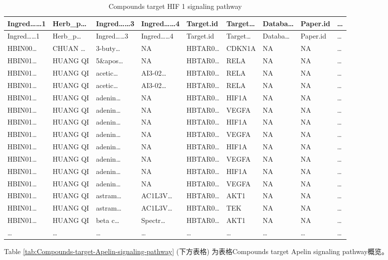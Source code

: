 \documentclass[
]{article}
\begin{document}
\begin{longtable}[]{@{}lllllllll@{}}
\caption{\label{tab:Compounds-target-HIF-1-signaling-pathway}Compounds target HIF 1 signaling pathway}\tabularnewline
\toprule
Ingred\ldots\ldots1 & Herb\_p\ldots{} & Ingred\ldots\ldots3 & Ingred\ldots\ldots4 & Target.id & Target\ldots{} & Databa\ldots{} & Paper.id & \ldots{}\tabularnewline
\midrule
\endfirsthead
\toprule
Ingred\ldots\ldots1 & Herb\_p\ldots{} & Ingred\ldots\ldots3 & Ingred\ldots\ldots4 & Target.id & Target\ldots{} & Databa\ldots{} & Paper.id & \ldots{}\tabularnewline
\midrule
\endhead
HBIN00\ldots{} & CHUAN \ldots{} & 3-buty\ldots{} & NA & HBTAR0\ldots{} & CDKN1A & NA & NA & \ldots{}\tabularnewline
HBIN01\ldots{} & HUANG QI & 5\&apos\ldots{} & NA & HBTAR0\ldots{} & RELA & NA & NA & \ldots{}\tabularnewline
HBIN01\ldots{} & HUANG QI & acetic\ldots{} & AI3-02\ldots{} & HBTAR0\ldots{} & RELA & NA & NA & \ldots{}\tabularnewline
HBIN01\ldots{} & HUANG QI & acetic\ldots{} & AI3-02\ldots{} & HBTAR0\ldots{} & RELA & NA & NA & \ldots{}\tabularnewline
HBIN01\ldots{} & HUANG QI & adenin\ldots{} & NA & HBTAR0\ldots{} & HIF1A & NA & NA & \ldots{}\tabularnewline
HBIN01\ldots{} & HUANG QI & adenin\ldots{} & NA & HBTAR0\ldots{} & VEGFA & NA & NA & \ldots{}\tabularnewline
HBIN01\ldots{} & HUANG QI & adenin\ldots{} & NA & HBTAR0\ldots{} & HIF1A & NA & NA & \ldots{}\tabularnewline
HBIN01\ldots{} & HUANG QI & adenin\ldots{} & NA & HBTAR0\ldots{} & VEGFA & NA & NA & \ldots{}\tabularnewline
HBIN01\ldots{} & HUANG QI & adenin\ldots{} & NA & HBTAR0\ldots{} & HIF1A & NA & NA & \ldots{}\tabularnewline
HBIN01\ldots{} & HUANG QI & adenin\ldots{} & NA & HBTAR0\ldots{} & VEGFA & NA & NA & \ldots{}\tabularnewline
HBIN01\ldots{} & HUANG QI & adenin\ldots{} & NA & HBTAR0\ldots{} & HIF1A & NA & NA & \ldots{}\tabularnewline
HBIN01\ldots{} & HUANG QI & adenin\ldots{} & NA & HBTAR0\ldots{} & VEGFA & NA & NA & \ldots{}\tabularnewline
HBIN01\ldots{} & HUANG QI & astram\ldots{} & AC1L3V\ldots{} & HBTAR0\ldots{} & AKT1 & NA & NA & \ldots{}\tabularnewline
HBIN01\ldots{} & HUANG QI & astram\ldots{} & AC1L3V\ldots{} & HBTAR0\ldots{} & TEK & NA & NA & \ldots{}\tabularnewline
HBIN01\ldots{} & HUANG QI & beta c\ldots{} & Spectr\ldots{} & HBTAR0\ldots{} & AKT1 & NA & NA & \ldots{}\tabularnewline
\ldots{} & \ldots{} & \ldots{} & \ldots{} & \ldots{} & \ldots{} & \ldots{} & \ldots{} & \ldots{}\tabularnewline
\bottomrule
\end{longtable}

Table \ref{tab:Compounds-target-Apelin-signaling-pathway} (下方表格) 为表格Compounds target Apelin signaling pathway概览。
\end{document}
